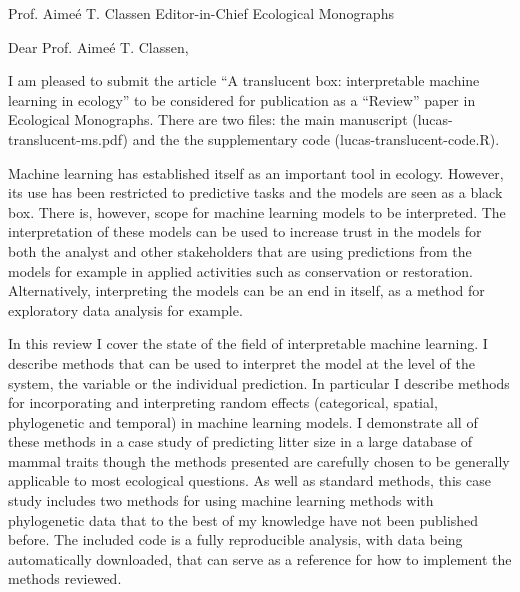 \documentclass[10pt, a4paper]{letter} %
\begin{document}

\begin{letter}{
Prof. Aimeé T. Classen
Editor-in-Chief
Ecological Monographs
}


\opening{Dear Prof. Aimeé T. Classen,}

I am pleased to submit the article ``A translucent box: interpretable machine learning in ecology'' to be considered for publication as a ``Review'' paper in Ecological Monographs.
There are two files: the main manuscript (lucas-translucent-ms.pdf) and the the supplementary code (lucas-translucent-code.R).

Machine learning has established itself as an important tool in ecology.
However, its use has been restricted to predictive tasks and the models are seen as a black box.
There is, however, scope for machine learning models to be interpreted.
The interpretation of these models can be used to increase trust in the models for both the analyst and other stakeholders that are using predictions from the models for example in applied activities such as conservation or restoration.
Alternatively, interpreting the models can be an end in itself, as a method for exploratory data analysis for example.

In this review I cover the state of the field of interpretable machine learning.
I describe methods that can be used to interpret the model at the level of the system, the variable or the individual prediction.
In particular I describe methods for incorporating and interpreting random effects (categorical, spatial, phylogenetic and temporal) in machine learning models.
I demonstrate all of these methods in a case study of predicting litter size in a large database of mammal traits though the methods presented are carefully chosen to be generally applicable to most ecological questions.
As well as standard methods, this case study includes two methods for using machine learning methods with phylogenetic data that to the best of my knowledge have not been published before.
The included code is a fully reproducible analysis, with data being automatically downloaded, that can serve as a reference for how to implement the methods reviewed.




\end{letter}
\end{document}

